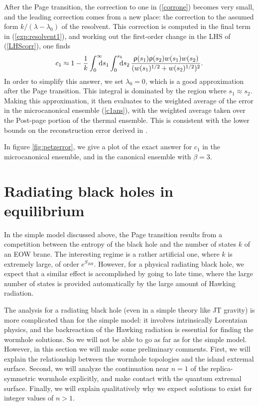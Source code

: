 \documentclass[12pt]{article}
\numberwithin{equation}{section}
\begin{document}
After the Page transition, the correction to one in (\ref{corrone}) becomes very small, and the leading correction comes from a new place: the correction to the assumed form $k/(\lambda-\lambda_0)$ of the resolvent. This correction is computed in the final term in (\ref{exp:resolvent1}), and working out the first-order change in the LHS of (\ref{LHScorr}), one finds
\begin{align}
c_1 \approx 1 - \frac{1}{k}\int_0^\infty\hspace{-7pt}\mathrm{d}s_1\int_0^{s_k}\hspace{-7pt}\mathrm{d}s_2\,\frac{\uprho(s_1)\uprho(s_2)w(s_1)w(s_2)}{(w(s_1)^{1/2}+w(s_2)^{1/2})^2}.
\end{align}
In order to simplify this answer, we set $\lambda_0 = 0$, which is a good approximation after the Page transition. This integral is dominated by the region where $s_1\approx s_2$. Making this approximation, it then evaluates to the weighted average of the error in the microcanonical ensemble (\ref{c1ans}), with the weighted average taken over the Post-page portion of the thermal ensemble. This is consistent with the lower bounds on the reconstruction error derived in \cite{Hayden:2018khn, Penington:2019npb}.

In figure \ref{fig:petzerror}, we give a plot of the exact answer for $c_1$ in the microcanonical ensemble, and in the canonical ensemble with $\beta = 3$.



\section{Radiating black holes in equilibrium}\label{sec:JT}
In the simple model discussed above, the Page transition results from a competition between the entropy of the black hole and the number of states $k$ of an EOW brane. The interesting regime is a rather artificial one, where $k$ is extremely large, of order $e^{S_{BH}}$. However, for a physical radiating black hole, we expect that a similar effect is accomplished by going to late time, where the large number of states is provided automatically by the large amount of Hawking radiation.

The analysis for a radiating black hole (even in a simple theory like JT gravity) is more complicated than for the simple model: it involves intrinsically Lorentzian physics, and the backreaction of the Hawking radiation is essential for finding the wormhole solutions. So we will not be able to go as far as for the simple model. However, in this section we will make some preliminary comments. First, we will explain the relationship between the wormhole topologies and the island extremal surface. Second, we will analyze the continuation near $n = 1$ of the replica-symmetric wormhole explicitly, and make contact with the quantum extremal surface. Finally, we will explain qualitatively why we expect solutions to exist for integer values of $n > 1$.
\end{document}
